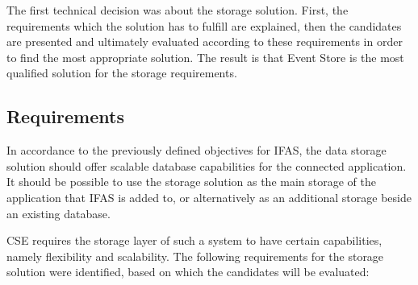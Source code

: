 The first technical decision was about the storage solution.
First, the requirements which the solution has to fulfill are explained, then the candidates are presented and ultimately evaluated according to these requirements in order to find the most appropriate solution.
The result is that Event Store is the most qualified solution for the storage requirements.

\subsection{Requirements}
\label{subsec:classifications:storage:req}

In accordance to the previously defined objectives for \ac{IFAS}, the data storage solution should offer scalable database capabilities for the connected application.
It should be possible to use the storage solution as the main storage of the application that \ac{IFAS} is added to, or alternatively as an additional storage beside an existing database.

\ac{CSE} requires the storage layer of such a system to have certain capabilities, namely flexibility and scalability.
The following requirements for the storage solution were identified, based on which the candidates will be evaluated:

